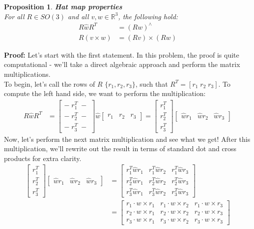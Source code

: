 \documentclass[oneside]{book}
\newtheorem{proposition}{Proposition}
\newenvironment{prop} %
  {\colorlet{shadecolor}{blue!9}\begin{shaded}\begin{proposition}}
  {\end{proposition}\end{shaded}}
\begin{document}
\begin{prop}
\textbf{Hat map properties}\\
For all $R \in SO(3)$ and all $v, w \in \mathbb{R}^3$, the following hold:
\begin{align}
    R\hat{w}R^T &= (Rw)^\wedge\\
    R(v\times w) &= (Rv) \times (Rw)
\end{align}
\end{prop}\noindent
\textbf{Proof: }Let's start with the first statement. In this problem, the proof is quite computational - we'll take a direct algebraic approach and perform the matrix multiplications.\\
To begin, let's call the rows of $R$ $\{r_1, r_2, r_3\}$, such that $R^T = [r_1\; r_2 \; r_3]$. To compute the left hand side, we want to perform the multiplication:
\begin{align}
    R\hat{w}R^T &= 
    \begin{bmatrix}
    - \;r_1^T \; -\\
    - \;r_2^T \; -\\
    - \;r_3^T \; -
    \end{bmatrix}
    \hat{w}
    \begin{bmatrix}
    r_1 & r_2 & r_3
    \end{bmatrix}
    = \begin{bmatrix}
    r_1^T\\
    r_2^T\\
    r_3^T
    \end{bmatrix}
    \begin{bmatrix}
    \hat{w}r_1 & \hat{w}r_2 & \hat{w}r_3
    \end{bmatrix}
\end{align}
Now, let's perform the next matrix multiplication and see what we get! After this multiplication, we'll rewrite out the result in terms of standard dot and cross products for extra clarity.
\begin{align}
    \begin{bmatrix}
    r_1^T\\
    r_2^T\\
    r_3^T
    \end{bmatrix}
    \begin{bmatrix}
    \hat{w}r_1 & \hat{w}r_2 & \hat{w}r_3
    \end{bmatrix}
    &=\begin{bmatrix}
    r_1^T\hat{w}r_1 & r_1^T\hat{w}r_2 & r_1^T\hat{w}r_3\\
    r_2^T\hat{w}r_1 & r_2^T\hat{w}r_2 & r_2^T\hat{w}r_3\\
    r_3^T\hat{w}r_1 & r_3^T\hat{w}r_2 & r_3^T\hat{w}r_3
    \end{bmatrix}\\
    &= 
    \begin{bmatrix}
    r_1\cdot w \times r_1 & r_1\cdot w\times r_2 & r_1 \cdot w\times r_3\\
    r_2\cdot w \times r_1 & r_2\cdot w\times r_2 & r_2 \cdot w\times r_3\\
    r_3\cdot w \times r_1 & r_3\cdot w\times r_2 & r_3 \cdot w\times r_3
    \end{bmatrix}
\end{align}
\end{document}

